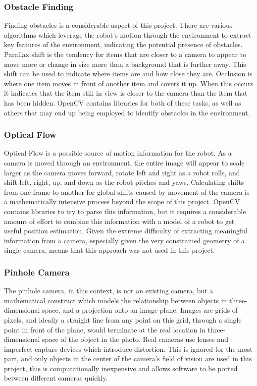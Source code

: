 \documentclass{article}[12]
\begin{document}
		\subsubsection{Obstacle Finding}
		
		Finding obstacles is a considerable aspect of this project. There are various algorithms which leverage the robot's motion through the environment to extract key features of the environment, indicating the potential presence of obstacles. Parallax shift is the tendency for items that are closer to a camera to appear to move more or change in size more than a background that is further away. This shift can be used to indicate where items are and how close they are. Occlusion is where one item moves in front of another item and covers it up. When this occurs it indicates that the item still in view is closer to the camera than the item that has been hidden. OpenCV contains libraries for both of these tasks, as well as others that may end up being employed to identify obstacles in the environment.
		
		\subsubsection{Optical Flow}
		
		Optical Flow is a possible source of motion information for the robot. As a camera is moved through an environment, the entire image will appear to scale larger as the camera moves forward, rotate left and right as a robot rolls, and shift left, right, up, and down as the robot pitches and yaws. Calculating shifts from one frame to another for global shifts caused by movement of the camera is a mathematically intensive process beyond the scope of this project. OpenCV contains libraries to try to parse this information, but it requires a considerable amount of effort to combine this information with a model of a robot to get useful position estimation. Given the extreme difficulty of extracting meaningful information from a camera, especially given the very constrained geometry of a single camera, means that this approach was not used in this project.
		
		\subsubsection{Pinhole Camera}
		
		The pinhole camera, in this context, is not an existing camera, but a mathematical construct which models the relationship between objects in three-dimensional space, and a projection onto an image plane. Images are grids of pixels, and ideally a straight line from any point on this grid, through a single point in front of the plane, would terminate at the real location in three-dimensional space of the object in the photo. Real cameras use lenses and imperfect capture devices which introduce distortion. This is ignored for the most part, and only objects in the center of the camera's field of vision are used in this project, this is computationally inexpensive and allows software to be ported between different cameras quickly. 
		
\end{document}
